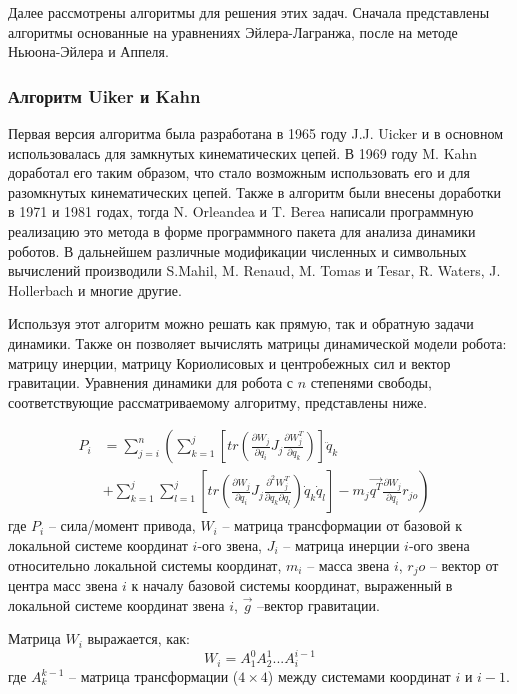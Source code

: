 Далее рассмотрены алгоритмы для решения этих задач. Сначала представлены алгоритмы основанные на уравнениях Эйлера-Лагранжа, после на методе Ньюона-Эйлера и Аппеля.

\subsubsection{Алгоритм Uiker и Kahn}
Первая версия алгоритма была разработана в 1965 году J.J. Uicker и в основном использовалась для замкнутых кинематических цепей. В 1969 году M. Kahn доработал его таким образом, что стало возможным использовать его и для разомкнутых кинематических цепей. Также в алгоритм были внесены доработки в 1971 и 1981 годах, тогда N. Orleandea и T. Berea написали программную реализацию это метода в форме программного пакета для анализа динамики роботов. В дальнейшем различные модификации численных и символьных вычислений производили S.Mahil, M. Renaud, M. Tomas и Tesar, R. Waters, J. Hollerbach и многие другие.

Используя этот алгоритм можно решать как прямую, так и обратную задачи динамики. Также он позволяет вычислять матрицы динамической модели робота: матрицу инерции, матрицу Кориолисовых и центробежных сил и вектор гравитации. Уравнения динамики для робота с $n$ степенями свободы, соответствующие рассматриваемому алгоритму, представлены ниже.

\begin{align}\label{eq1}
P_i &= \sum_{j=i}^{n}
\left(
\sum_{k=1}^{j}
\left[
tr(\frac{\partial W_j}{\partial q_i} J_j \frac{\partial W_j^T}{\partial q_k})
\right] \ddot q_k 
\right.&\\
&+
\left.
\sum_{k=1}^{j} \sum_{l=1}^{j} 
\left[
tr(\frac{\partial W_j}{\partial q_i} J_j \frac{\partial^2 W_j^T}{\partial q_k \partial q_l})\dot q_k \dot q_l
\right]
-m_j \vec{q^T} \frac{\partial W_j}{\partial q_i} r_{jo}
\right)
\end{align}
где $P_i$ -- сила/момент привода, $W_i$ -- матрица трансформации от базовой к локальной системе координат $i$-ого звена, $J_i$ -- матрица инерции $i$-ого звена относительно локальной системы координат, $m_i$ -- масса звена $i$, $r_jo$ -- вектор от центра масс звена $i$ к началу базовой системы координат, выраженный в локальной системе координат звена $i$, $\vec g$ --вектор гравитации.

Матрица $W_i$ выражается, как:
\begin{equation}
W_i = A_1^0 A_2^1 ... A_i^{i-1}
\end{equation}
где $A_k^{k-1}$ -- матрица трансформации ($4 \times 4$) между системами координат $i$ и $i-1$.

